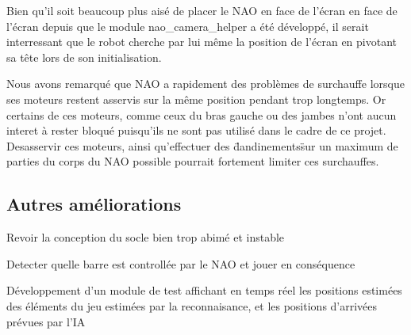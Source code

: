     \par Bien qu'il soit beaucoup plus aisé de placer le NAO en face de l'écran en face de l'écran depuis que le module nao\_camera\_helper a été développé,
    il serait interressant que le robot cherche par lui même la position de l'écran en pivotant sa tête lors de son initialisation.\\

    \par Nous avons remarqué que NAO a rapidement des problèmes de surchauffe lorsque ses moteurs restent asservis sur la même position pendant trop longtemps.
    Or certains de ces moteurs, comme ceux du bras gauche ou des jambes n'ont aucun interet à rester bloqué puisqu'ils ne sont pas utilisé dans le cadre de ce projet.
    Desasservir ces moteurs, ainsi qu'effectuer des \"dandinements\" sur un maximum de parties du corps du NAO possible pourrait fortement limiter ces surchauffes.

  \subsection{Autres améliorations}
  \label{sub:Autres améliorations}
    \par Revoir la conception du socle bien trop abimé et instable
    \par Detecter quelle barre est controllée par le NAO et jouer en conséquence
    \par Développement d'un module de test affichant en temps réel les positions estimées des éléments du jeu estimées par la reconnaisance, et les positions d'arrivées prévues par l'IA
\pagebreak
